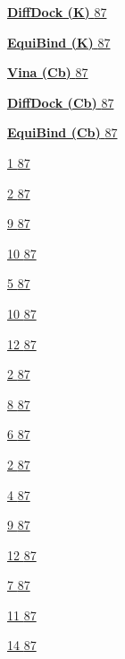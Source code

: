 \protect\hyperlink{_Toc235735964}{\textbf{DiffDock (K)} \protect\hyperlink{_Toc235735964}{87}}

\protect\hyperlink{_Toc235735965}{\textbf{EquiBind (K)} \protect\hyperlink{_Toc235735965}{87}}

\protect\hyperlink{_Toc235735966}{\textbf{Vina (Cb)} \protect\hyperlink{_Toc235735966}{87}}

\protect\hyperlink{_Toc235735967}{\textbf{DiffDock (Cb)} \protect\hyperlink{_Toc235735967}{87}}

\protect\hyperlink{_Toc235735968}{\textbf{EquiBind (Cb)} \protect\hyperlink{_Toc235735968}{87}}

\protect\hyperlink{_Toc235735969}{1 \protect\hyperlink{_Toc235735969}{87}}

\protect\hyperlink{_Toc235735970}{2 \protect\hyperlink{_Toc235735970}{87}}

\protect\hyperlink{_Toc235735971}{9 \protect\hyperlink{_Toc235735971}{87}}

\protect\hyperlink{_Toc235735972}{10 \protect\hyperlink{_Toc235735972}{87}}

\protect\hyperlink{_Toc235735973}{5 \protect\hyperlink{_Toc235735973}{87}}

\protect\hyperlink{_Toc235735974}{10 \protect\hyperlink{_Toc235735974}{87}}

\protect\hyperlink{_Toc235735975}{12 \protect\hyperlink{_Toc235735975}{87}}

\protect\hyperlink{_Toc235735976}{2 \protect\hyperlink{_Toc235735976}{87}}

\protect\hyperlink{_Toc235735977}{8 \protect\hyperlink{_Toc235735977}{87}}

\protect\hyperlink{_Toc235735978}{6 \protect\hyperlink{_Toc235735978}{87}}

\protect\hyperlink{_Toc235735979}{2 \protect\hyperlink{_Toc235735979}{87}}

\protect\hyperlink{_Toc235735980}{4 \protect\hyperlink{_Toc235735980}{87}}

\protect\hyperlink{_Toc235735981}{9 \protect\hyperlink{_Toc235735981}{87}}

\protect\hyperlink{_Toc235735982}{12 \protect\hyperlink{_Toc235735982}{87}}

\protect\hyperlink{_Toc235735983}{7 \protect\hyperlink{_Toc235735983}{87}}

\protect\hyperlink{_Toc235735984}{11 \protect\hyperlink{_Toc235735984}{87}}

\protect\hyperlink{_Toc235735985}{14 \protect\hyperlink{_Toc235735985}{87}}

